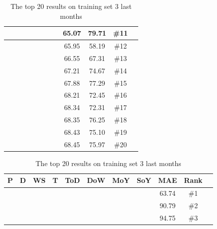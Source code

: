 \begin{table}[H]
{\begin{tabular}{|c|c|c|c|c|c|c|c|c|c|c|c|}
 \x    & \x    & \x    &       & \x    & \x    & \x\m  &       & 65.07 & 79.71 & \#11 \\ \hline
 \x    & \x    & \x    & \x    & \x\m  & \x\m  &       &       & 65.95 & 58.19 & \#12 \\ \hline
 \x    & \x    & \x    & \x    & \x\m  & \x\m  & \x\m  &       & 66.55 & 67.31 & \#13 \\ \hline
 \x    & \x    & \x    &       & \x    &       &       & \x\m  & 67.21 & 74.67 & \#14 \\ \hline
 \x    & \x    & \x    & \x    & \x    & \x    &       &       & 67.88 & 77.29 & \#15 \\ \hline
 \x    & \x    & \x    &       & \x    & \x    &       & \x    & 68.21 & 72.45 & \#16 \\ \hline
 \x    & \x    & \x    &       & \x\m  & \x\m  &       &       & 68.34 & 72.31 & \#17 \\ \hline
 \x    & \x    & \x    &       & \x\m  &       &       & \x\m  & 68.35 & 76.25 & \#18 \\ \hline
 \x    & \x    & \x    & \x    & \x    & \x    & \x    &       & 68.43 & 75.10 & \#19 \\ \hline
 \x    & \x    & \x    & \x    & \x    &       &       & \x\m  & 68.45 & 75.97 & \#20 \\ \hline 
\end{tabular}
}
\caption{The top 20 results on training set 3 last months} %
\label{table:Top20Prices} %
\end{table}

\begin{table}[H]
\centering  %
\begin{tabular}{|c|c|c|c|c|c|c|c|c|c|c|} %
\hline
P & D & WS & T & ToD & DoW & MoY & SoY & MAE & Rank\\ [0.5ex] %
\hline
\x    & \x    & \x    & \x    & \x\m  & \x\m  & \x\m  &       & 63.74 & \#1 \\ \hline
\x    & \x    & \x    & \x    & \x\m  & \x\m  &       &       & 90.79 & \#2 \\ \hline
\x    & \x    & \x    & \x    & \x\m  & \x\m  &       & \x\m  & 94.75 & \#3 \\ \hline
\end{tabular}
\caption{The top 20 results on training set 3 last months} %
\label{table:1YearTrain} %
\end{table}

